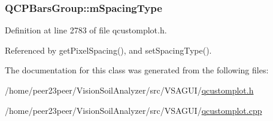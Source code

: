 \subsubsection[{m\+Spacing\+Type}]{ Q\+C\+P\+Bars\+Group\+::m\+Spacing\+Type\hspace{0.3cm}{\ttfamily [protected]}}\label{class_q_c_p_bars_group_a6794ee1a9c81864d627bff6a4b2d64ec}


Definition at line 2783 of file qcustomplot.\+h.



Referenced by get\+Pixel\+Spacing(), and set\+Spacing\+Type().



The documentation for this class was generated from the following files\+:\begin{DoxyCompactItemize}
\item 
/home/peer23peer/\+Vision\+Soil\+Analyzer/src/\+V\+S\+A\+G\+U\+I/\hyperlink{qcustomplot_8h}{qcustomplot.\+h}\item 
/home/peer23peer/\+Vision\+Soil\+Analyzer/src/\+V\+S\+A\+G\+U\+I/\hyperlink{qcustomplot_8cpp}{qcustomplot.\+cpp}\end{DoxyCompactItemize}
